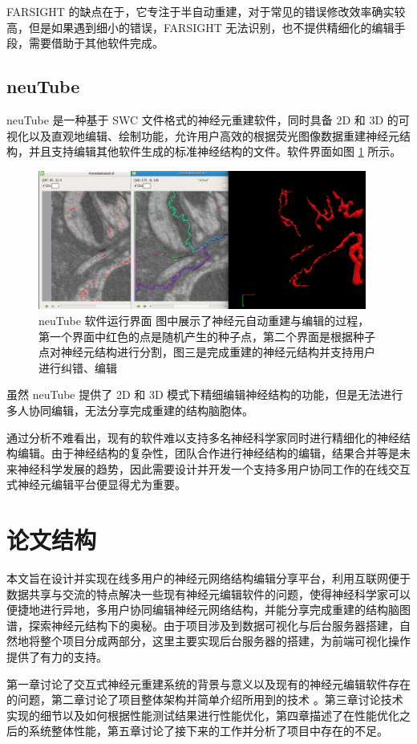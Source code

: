 FARSIGHT 的缺点在于，它专注于半自动重建，对于常见的错误修改效率确实较高，但是如果遇到细小的错误，FARSIGHT 无法识别，也不提供精细化的编辑手段，需要借助于其他软件完成。

\subsection{neuTube}
neuTube 是一种基于 SWC 文件格式的神经元重建软件，同时具备 2D 和 3D 的可视化以及直观地编辑、绘制功能，允许用户高效的根据荧光图像数据重建神经元结构，并且支持编辑其他软件生成的标准神经结构的文件。软件界面如图 \ref{neutube} 所示。

\begin{figure}
\centering
\includegraphics[width=108mm]{images/neutube}
\caption{neuTube 软件运行界面 图中展示了神经元自动重建与编辑的过程，第一个界面中红色的点是随机产生的种子点，第二个界面是根据种子点对神经元结构进行分割，图三是完成重建的神经元结构并支持用户进行纠错、编辑}
\label{neutube}
\end{figure}

虽然 neuTube 提供了 2D 和 3D 模式下精细编辑神经结构的功能，但是无法进行多人协同编辑，无法分享完成重建的结构脑胞体。

通过分析不难看出，现有的软件难以支持多名神经科学家同时进行精细化的神经结构编辑。由于神经结构的复杂性，团队合作进行神经结构的编辑，结果合并等是未来神经科学发展的趋势，因此需要设计并开发一个支持多用户协同工作的在线交互式神经元编辑平台便显得尤为重要。

\section{论文结构}
本文旨在设计并实现在线多用户的神经元网络结构编辑分享平台，利用互联网便于数据共享与交流的特点解决一些现有神经元编辑软件的问题，使得神经科学家可以便捷地进行异地，多用户协同编辑神经元网络结构，并能分享完成重建的结构脑图谱，探索神经元结构下的奥秘。由于项目涉及到数据可视化与后台服务器搭建，自然地将整个项目分成两部分，这里主要实现后台服务器的搭建，为前端可视化操作提供了有力的支持。

第一章讨论了交互式神经元重建系统的背景与意义以及现有的神经元编辑软件存在的问题，第二章讨论了项目整体架构并简单介绍所用到的技术
。第三章讨论技术实现的细节以及如何根据性能测试结果进行性能优化，第四章描述了在性能优化之后的系统整体性能，第五章讨论了接下来的工作并分析了项目中存在的不足。

